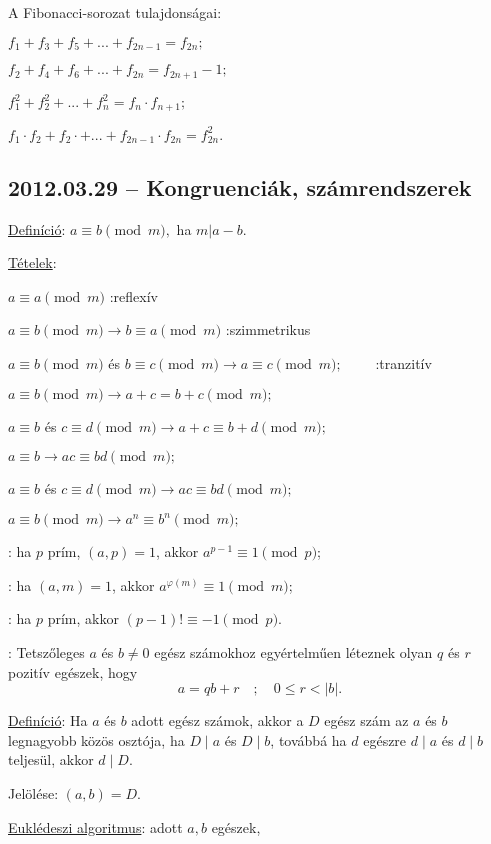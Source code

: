 \documentclass{article}
\begin{document}
A Fibonacci-sorozat tulajdonságai:

$f_1+f_3+f_5+...+f_{2n-1}=f_{2n};$

$f_2+f_4+f_6+...+f_{2n}=f_{2n+1}-1;$

$f_1^2+f_2^2+...+f_n^2=f_n\cdot f_{n+1};$

$f_1\cdot f_2+f_2\cdot +...+f_{2n-1}\cdot f_{2n}=f_{2n}^2.$

\subsection*{2012.03.29 -- Kongruenciák, számrendszerek}
\underline{Definíció}: $a\equiv b \pmod{m},$ ha $m|a-b$.

\noindent\underline{Tételek}:

$a\equiv a\pmod{m}$ :reflexív

$a\equiv b\pmod{m} \longrightarrow b\equiv a\pmod{m}$ :szimmetrikus

$a\equiv b\pmod{m}$ és $b\equiv c\pmod{m}\longrightarrow a\equiv c\pmod{m};\qquad$ :tranzitív

$a\equiv b\pmod{m}\longrightarrow a+c=b+c\pmod{m};$

$a\equiv b$ és $c\equiv d\pmod{m} \longrightarrow a+c\equiv b+d\pmod{m};$

$a\equiv b\longrightarrow ac\equiv bd\pmod{m};$

$a\equiv b$ és $c\equiv d\pmod{m}\longrightarrow ac\equiv bd\pmod{m};$

$a\equiv b\pmod{m}\longrightarrow a^n\equiv b^n\pmod{m};$

: ha $p$ prím, $(a,p)=1$, akkor 
$a^{p-1}\equiv 1\pmod{p}$;

: ha $(a,m)=1$, akkor 
$a^{\varphi(m)}\equiv 1\pmod{m}$;

: ha $p$ prím, akkor 
$(p-1)!\equiv -1\pmod{p}$.

: Tetszőleges $a$ és $b\not=0$ egész számokhoz egyértelműen léteznek olyan $q$ és $r$ pozitív egészek, hogy
$$a=qb+r\quad ;\quad 0\leq r<|b|.$$

\noindent\underline{Definíció}: Ha $a$ és $b$ adott egész számok, akkor a  $D$ egész szám az $a$ és $b$ legnagyobb közös osztója, ha $D\mid a$ és $D\mid b$, továbbá ha $d$ egészre $d\mid a$ és $d\mid b$ teljesül, akkor $d\mid D$.

Jelölése: $(a,b)=D$.

\noindent\underline{Euklédeszi algoritmus}: adott  $a,b$ egészek,
\end{document}
